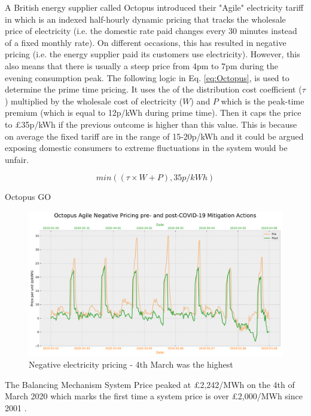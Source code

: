 \documentclass[energies,article,submit,moreauthors,pdftex]{Definitions/mdpi}
\begin{document}
A British energy supplier called Octopus \cite{AgileEnergy} introduced their "Agile" electricity tariff in which is an indexed half-hourly dynamic pricing that tracks the wholesale price of electricity (i.e. the domestic rate paid changes every 30 minutes instead of a fixed monthly rate). On different occasions, this has resulted in negative pricing (i.e. the energy supplier paid its customers use electricity). However, this also means that there is usually a steep price from 4pm to 7pm during the evening consumption peak. The following logic in Eq. \ref{eq:Octopus}, is used to determine the prime time pricing. It uses the of the distribution cost coefficient ($\tau$) multiplied by the wholesale cost of electricity ($W$) and $P$ which is the peak-time premium (which is equal to 12p/kWh during prime time). Then it caps the price to £35p/kWh if the previous outcome is higher than this value. This is because on average the fixed tariff are in the range of 15-20p/kWh and it could be argued exposing domestic consumers to extreme fluctuations in the system would be unfair.

\begin{equation}\label{eq:Octopus}
min((\tau \times W + P), 35p/kWh)
\end{equation}

Octopus GO


\begin{figure}[H]\centering
\hspace{-25pt}\includegraphics[width=15 cm]{Graphics/Pre-post_Agilecomp_negative.pdf}
\caption{Negative electricity pricing - 4th March was the highest }\label{fig:neg_agile_comp_prepost}
\end{figure}  

The Balancing Mechanism System Price peaked at £2,242/MWh on the 4th of March 2020 which marks the first time a system price is over £2,000/MWh since 2001 \cite{ELEXON2020ELEXONBMRS}. 
\end{document}
